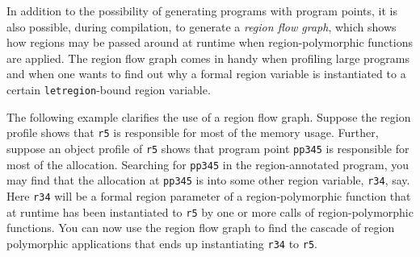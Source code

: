 \documentclass[12pt]{book}
\begin{document}
In addition to the possibility of generating programs with program
points, it is also possible, during compilation, to generate a
%
{\em region flow graph}, which shows how regions may be passed around
at runtime when region-polymorphic functions are applied. The region
flow graph comes in handy when profiling large programs and when one wants
to find out why a formal region variable is instantiated to a
certain {\tt letregion}-bound region variable.

The following example clarifies the use of a region flow graph.
Suppose the region profile shows that \texttt{r5} is responsible for
most of the memory usage.  Further, suppose an object profile of
\texttt{r5} shows that program point \texttt{pp345} is responsible for
most of the allocation.  Searching for \texttt{pp345} in the
region-annotated program, you may find that the allocation at
\texttt{pp345} is into some other region variable, \texttt{r34}, say.
Here \texttt{r34} will be a formal region parameter of a
region-polymorphic function that at runtime has been instantiated to
\texttt{r5} by one or more calls of region-polymorphic functions.
You can now use the region flow graph to find the cascade of region
polymorphic applications that ends up instantiating \texttt{r34} to
\texttt{r5}.
\end{document}
